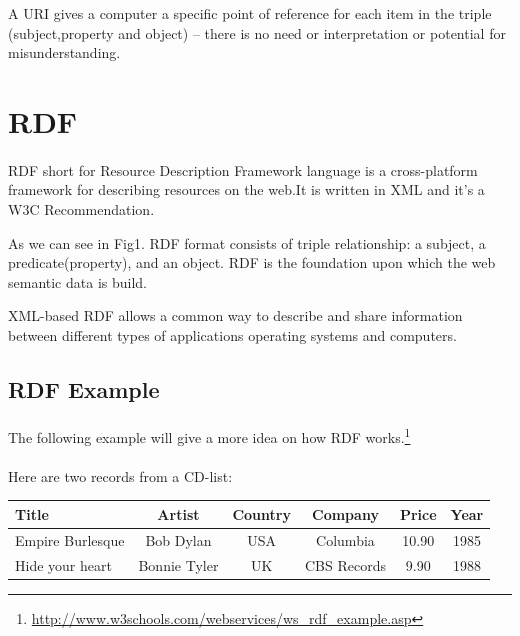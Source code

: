 \documentclass[a4paper,11pt]{report}
\begin{document}
 A URI gives a computer a specific point of reference for each item in the triple (subject,property and object) -- there is no need or interpretation or potential for misunderstanding.

\section{RDF}
\paragraph{}
RDF short for Resource Description Framework language is a  {\color{red}cross-platform framework} for describing resources on the web.It is written in XML and it's a W3C Recommendation.

As we can see in Fig1. RDF format consists of triple relationship: a subject, a predicate(property), and an object. RDF is the foundation upon which the web semantic data is build.

XML-based RDF allows a common way to describe and share information between different types of applications operating systems and computers.
 

\subsection{RDF Example}
\paragraph{}
The following example will give a more idea on how RDF works.\footnote{\url{
http://www.w3schools.com/webservices/ws_rdf_example.asp}}
 
 \paragraph{}
Here are two records from a CD-list:
 
\begin{center} 
\begin{tabular}{ | l | c | c | c | c | c |}
 \hline
 Title & Artist & Country & Company & Price & Year \\ \hline
 Empire Burlesque & Bob Dylan & USA &	Columbia & 10.90 &	1985 \\
 \hline
  Hide your heart & Bonnie Tyler & UK &	CBS Records &9.90 &	1988 \\
 \hline
\end{tabular}
\end{center}
\end{document}
